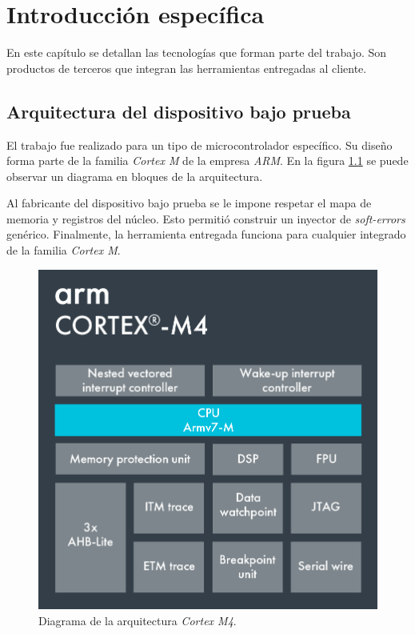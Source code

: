 \chapter{Introducción específica}

\label{Chapter2}

En este capítulo se detallan las tecnologías que forman parte del trabajo.
Son productos de terceros que integran las herramientas entregadas al cliente.

\section{Arquitectura del dispositivo bajo prueba}
\label{sec:dut}

El trabajo fue realizado para un tipo de microcontrolador específico.
Su diseño forma parte de la familia \emph{Cortex M} de la empresa \emph{ARM}.
En la figura \ref{fig:cortexm} se puede observar un diagrama en bloques de la arquitectura.

Al fabricante del dispositivo bajo prueba se le impone respetar el mapa de memoria y registros del núcleo.
Esto permitió construir un inyector de \emph{soft-errors} genérico.
Finalmente, la herramienta entregada funciona para cualquier integrado de la familia \emph{Cortex M}.

\begin{figure}[htbp]
	\centering
	\includegraphics[width=.7\textwidth]{./Figures/Cortex-M4.png}
    \caption{Diagrama de la arquitectura \emph{Cortex M4}\protect\footnotemark.}
	\label{fig:cortexm}
\end{figure}

\newpage

